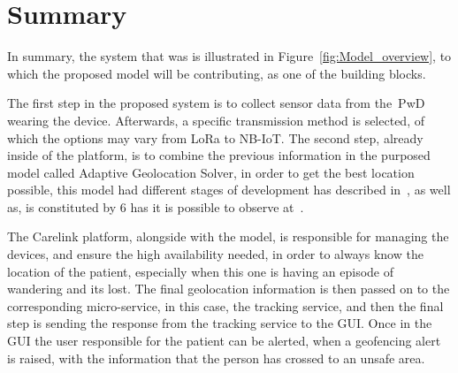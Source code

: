  
 
 
 
 
 
 
 
 
 
 
 
 
 

 
 
 
 
 
 
 
\newpage
\section{Summary}
\label{summary}
In summary, the system that was is illustrated in Figure~\ref{fig:Model_overview}, to which the proposed model will be contributing, as one of the building blocks. 

The first step in the proposed system is to collect sensor data from the~\gls{PwD} wearing the device. Afterwards, a specific transmission method is selected, of which the options may vary from LoRa to NB-IoT.
The second step, already inside of the platform, is to combine the previous information in the purposed model called Adaptive Geolocation Solver, in order to get the best location possible, this model had different stages of development has described in~, as well as, is constituted by 6 has it is possible to observe at~. 

The Carelink platform, alongside with the model, is responsible for managing the devices, and ensure the high availability needed, in order to always know the location of the patient, especially when this one is having an episode of wandering and its lost. 
The final geolocation information is then passed on to the corresponding micro-service, in this case, the tracking service, and then the final step is sending the response from the tracking service to the GUI.
Once in the GUI the user responsible for the patient can be alerted,  when a geofencing alert is raised, with the information that the person has crossed to an unsafe area.

